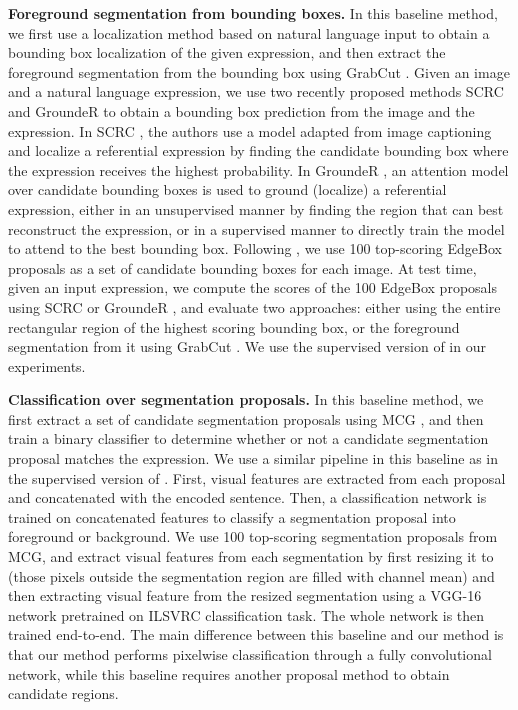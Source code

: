 \documentclass[runningheads]{llncs}
\begin{document}
\textbf{Foreground segmentation from bounding boxes.}
In this baseline method, we first use a localization method based on natural language input \cite{hu2015natural,rohrbach2015grounding} to obtain a bounding box localization of the given expression, and then extract the foreground segmentation from the bounding box using GrabCut \cite{rother2004grabcut}. Given an image and a natural language expression, we use two recently proposed methods SCRC \cite{hu2015natural} and GroundeR \cite{rohrbach2015grounding} to obtain a bounding box prediction from the image and the expression. In SCRC \cite{hu2015natural}, the authors use a model adapted from image captioning and localize a referential expression by finding the candidate bounding box where the expression receives the highest probability. In GroundeR \cite{rohrbach2015grounding}, an attention model over candidate bounding boxes is used to ground (localize) a referential expression, either in an unsupervised manner by finding the region that can best reconstruct the expression, or in a supervised manner to directly train the model to attend to the best bounding box. Following \cite{hu2015natural,rohrbach2015grounding}, we use 100 top-scoring EdgeBox \cite{zitnick2014edge} proposals as a set of candidate bounding boxes for each image. At test time, given an input expression, we compute the scores of the 100 EdgeBox proposals using SCRC \cite{hu2015natural} or GroundeR \cite{rohrbach2015grounding}, and evaluate two approaches: either using the entire rectangular region of the highest scoring bounding box, or the foreground segmentation from it using GrabCut \cite{rother2004grabcut}. We use the supervised version of \cite{rohrbach2015grounding} in our experiments.

\textbf{Classification over segmentation proposals.}
In this baseline method, we first extract a set of candidate segmentation proposals using MCG \cite{arbelaez2014multiscale}, and then train a binary classifier to determine whether or not a candidate segmentation proposal matches the expression. We use a similar pipeline in this baseline as in the supervised version of \cite{rohrbach2015grounding}. First, visual features are extracted from each proposal and concatenated with the encoded sentence. Then, a classification network is trained on concatenated features to classify a segmentation proposal into foreground or background. We use 100 top-scoring segmentation proposals from MCG, and extract visual features from each segmentation by first resizing it to  (those pixels outside the segmentation region are filled with channel mean) and then extracting visual feature from the resized segmentation using a VGG-16 network pretrained on ILSVRC classification task. The whole network is then trained end-to-end. The main difference between this baseline and our method is that our method performs pixelwise classification through a fully convolutional network, while this baseline requires another proposal method to obtain candidate regions.
\end{document}
